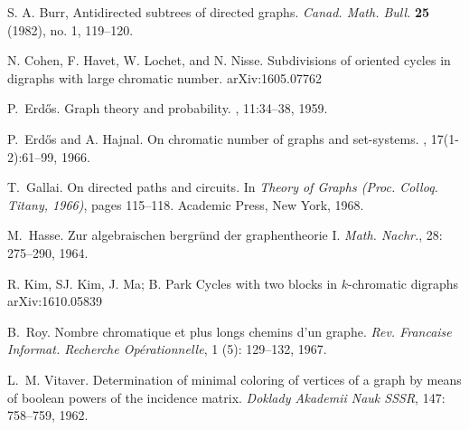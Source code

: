 \documentclass{endm}
\begin{document}
\begin{thebibliography}{10}
 S. A. Burr,
Antidirected subtrees of directed graphs.
{\it Canad. Math. Bull.} {\bf 25} (1982), no. 1, 119--120.

N. Cohen, F. Havet, W. Lochet, and N. Nisse.
\newblock Subdivisions of oriented cycles in digraphs with large chromatic number.
\newblock arXiv:1605.07762

P.~Erd{\H{o}}s.
\newblock Graph theory and probability.
, 11:34--38, 1959.

P.~Erd{\H{o}}s and A. Hajnal.
\newblock On chromatic number of graphs and set-systems.
, 17(1-2):61--99, 1966.



T.~Gallai.
\newblock On directed paths and circuits.
\newblock In \emph{Theory of Graphs (Proc. Colloq. Titany, 1966)}, pages
  115--118. Academic Press, New York, 1968.



M.~Hasse.
\newblock Zur algebraischen bergr\"und der graphentheorie {I}.
\newblock \emph{Math. Nachr.}, 28: 275--290, 1964.


R. Kim, SJ. Kim, J. Ma; B. Park
\newblock Cycles with two blocks in $k$-chromatic digraphs
\newblock arXiv:1610.05839



B.~Roy.
\newblock Nombre chromatique et plus longs chemins d'un graphe.
\newblock \emph{Rev. Francaise Informat. Recherche Op\'erationnelle},
  1 (5): 129--132, 1967.



L.~M. Vitaver.
\newblock Determination of minimal coloring of vertices of a graph by means of
  boolean powers of the incidence matrix.
\newblock \emph{Doklady Akademii Nauk SSSR}, 147: 758--759, 1962.




\end{thebibliography}
\end{document}
